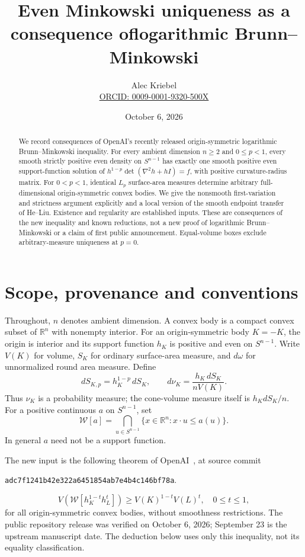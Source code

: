 \documentclass[11pt]{article}
\title{Even Minkowski uniqueness as a consequence of\newline logarithmic Brunn--Minkowski}
\author{Alec Kriebel\\\small\href{https://orcid.org/0009-0001-9320-500X}{ORCID: 0009-0001-9320-500X}}
\date{October 6, 2026}
\newcommand{\R}{\mathbb R}
\newcommand{\Sph}{S^{n-1}}
\newcommand{\W}{\mathcal W}
\begin{document}
\maketitle
\begin{abstract}
We record consequences of OpenAI's recently released origin-symmetric logarithmic Brunn--Minkowski inequality. For every ambient dimension $n\ge2$ and $0\le p<1$, every smooth strictly positive even density on $S^{n-1}$ has exactly one smooth positive even support-function solution of $h^{1-p}\det(\nabla^2h+hI)=f$, with positive curvature-radius matrix. For $0<p<1$, identical $L_p$ surface-area measures determine arbitrary full-dimensional origin-symmetric convex bodies. We give the nonsmooth first-variation and strictness argument explicitly and a local version of the smooth endpoint transfer of He--Liu. Existence and regularity are established inputs. These are consequences of the new inequality and known reductions, not a new proof of logarithmic Brunn--Minkowski or a claim of first public announcement. Equal-volume boxes exclude arbitrary-measure uniqueness at $p=0$.
\end{abstract}

\section{Scope, provenance and conventions}

Throughout, $n$ denotes ambient dimension. A convex body is a compact convex subset of $\R^n$ with nonempty interior. For an origin-symmetric body $K=-K$, the origin is interior and its support function $h_K$ is positive and even on $\Sph$. Write $V(K)$ for volume, $S_K$ for ordinary surface-area measure, and $d\omega$ for unnormalized round area measure. Define
\[
 dS_{K,p}=h_K^{1-p}\,dS_K,\qquad
 d\nu_K=\frac{h_K\,dS_K}{nV(K)}.
\]
Thus $\nu_K$ is a probability measure; the cone-volume measure itself is $h_KdS_K/n$. For a positive continuous $a$ on $\Sph$, set
\[
 \W[a]=\bigcap_{u\in\Sph}\{x\in\R^n:x\cdot u\le a(u)\}.
\]
In general $a$ need not be a support function.

The new input is the following theorem of OpenAI~\cite{OAI}, at source commit
\begin{center}\small\texttt{adc7f1241b42e322a6451854ab7e4b4c146bf78a}.\end{center}
\begin{equation}\label{LBM}
 V(\W[h_K^{1-t}h_L^t])\ge V(K)^{1-t}V(L)^t,
 \quad 0\le t\le1,
\end{equation}
for all origin-symmetric convex bodies, without smoothness restrictions. The public repository release was verified on October 6, 2026; September 23 is the upstream manuscript date. The deduction below uses only this inequality, not its equality classification.
\end{document}
